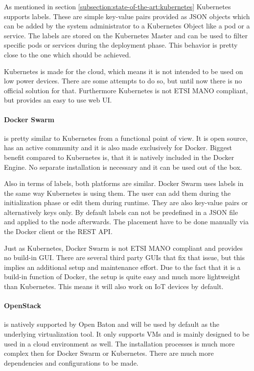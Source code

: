 As mentioned in section \ref{subsection:state-of-the-art:kubernetes} Kubernetes supports labels.
These are simple key-value pairs provided as \ac{JSON} objects which can be added by the system administrator to a Kubernetes Object like a pod or a service.
The labels are stored on the Kubernetes Master and can be used to filter specific pods or services during the deployment phase.
This behavior is pretty close to the one which should be achieved.

Kubernetes is made for the cloud, which means it is not intended to be used on low power devices.
There are some attempts\autocite{kubernetes-installer-rpi}\autocite{kubernetes-on-arm}\autocite{hypriot:kubernetes-on-rpi} to do so, but until now there is no official solution for that.
Furthermore Kubernetes is not \ac{ETSI} \ac{MANO} compliant, but provides an easy to use web \ac{UI}.

\paragraph{Docker Swarm} is pretty similar to Kubernetes from a functional point of view.
It is open source, has an active community and it is also made exclusively for Docker.
Biggest benefit compared to Kubernetes is, that it is natively included in the Docker Engine.
No separate installation is necessary and it can be used out of the box.

Also in terms of labels, both platforms are similar.
Docker Swarm uses labels in the same way Kubernetes is using them.
The user can add them during the initialization phase or edit them during runtime.
They are also key-value pairs or alternatively keys only.
By default labels can not be predefined in a \ac{JSON} file and applied to the node afterwards.
The placement have to be done manually via the Docker client or the \ac{REST} \ac{API}.

Just as Kubernetes, Docker Swarm is not \ac{ETSI} \ac{MANO} compliant and provides no build-in \ac{GUI}.
There are several third party \acp{GUI} that fix that issue, but this implies an additional setup and maintenance effort.
Due to the fact that it is a build-in function of Docker, the setup is quite easy and much more lightweight than Kubernetes.
This means it will also work on \ac{IoT} devices by default.

\paragraph{OpenStack} is natively supported by Open Baton and will be used by default as the underlying virtualization tool.
It only supports \acp{VM} and is mainly designed to be used in a cloud environment as well.
The installation processes is much more complex then for Docker Swarm or Kubernetes.
There are much more dependencies and configurations to be made.

